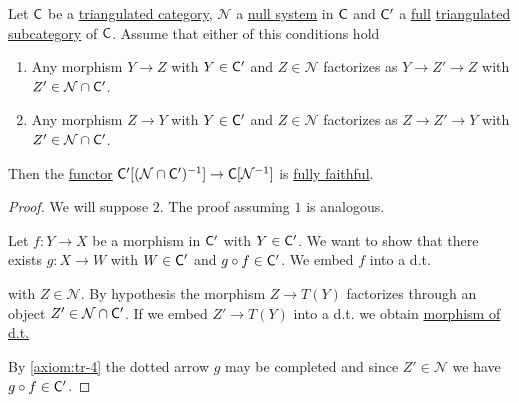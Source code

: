 \documentclass[../../main]{subfiles}
\begin{document}
\begin{proposition}
  Let \(\mathsf{C}\) be a \hyperref[def:triangulated-category]{triangulated category}, \(\mathcal{N}\) a \hyperref[def:null-system]{null system} in \(\mathsf{C}\) and \(\mathsf{C'}\) a \hyperref[def:subcategory]{full} \hyperref[def:triangulated-subcategory]{triangulated subcategory} of \(\mathsf{C}\).
  Assume that either of this conditions hold
  \begin{enumerate}
    \item Any morphism \(Y \to Z\) with \(Y \in \mathsf{C'}\) and \(Z \in \mathcal{N}\) factorizes as \(Y \to Z' \to Z\) with \(Z' \in \mathcal{N} \cap \mathsf{C'}\).
    \item Any morphism \(Z \to Y\) with \(Y \in \mathsf{C'}\) and \(Z \in \mathcal{N}\) factorizes as \(Z \to Z' \to Y\) with \(Z' \in \mathcal{N} \cap \mathsf{C'}\).
  \end{enumerate}
  Then the \hyperref[def:functor]{functor} \(\mathsf{C'}[(\mathcal{N} \cap \mathsf{C'})^{-1}] \to \mathsf{C}[\mathcal{N}^{-1}]\) is \hyperref[def:functor-types]{fully faithful}.
\end{proposition}
\begin{proof}
  We will suppose \(2.\) The proof assuming \(1\) is analogous.

  Let \(f: Y \to X\) be a morphism in \(\mathsf{C'}\) with \(Y \in \mathsf{C'}\).
  We want to show that there exists \(g: X \to W\) with \(W \in \mathsf{C'}\) and \(g \circ f \in \mathsf{C'}\).
  We embed \(f\) into a d.t.
  \begin{center}
  \end{center}
  with \(Z \in \mathcal{N}\).
  By hypothesis the morphism \(Z \to T(Y)\) factorizes through an object \(Z' \in \mathcal{N} \cap \mathsf{C'}\).
  If we embed \(Z' \to T(Y)\) into a d.t. we obtain \hyperref[def:triangle]{morphism of d.t.}
  \begin{center}
  \end{center}
  By \ref{axiom:tr-4} the dotted arrow \(g\) may be completed and since \(Z' \in \mathcal{N}\) we have \(g \circ f \in \mathsf{C'}\).
\end{proof}
\end{document}
